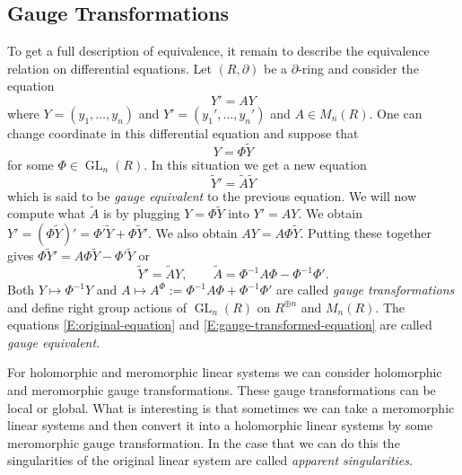 \documentclass[12pt]{book}
\numberwithin{equation}{section}
\theoremstyle{definition}
\theoremstyle{remark}
\newcommand{\GL}{\operatorname{GL}}
\begin{document}
\subsection{Gauge Transformations}
To get a full description of equivalence, it remain to describe the equivalence relation on differential equations.
Let $(R,\partial)$ be a $\partial$-ring and consider the equation
\begin{equation}\label{E:original-equation}
Y' = AY
\end{equation}
where $Y = (y_1,\ldots,y_n)$ and $Y' =(y_1',\ldots,y_n')$ and $A \in M_n(R)$. 
One can change coordinate in this differential equation and suppose that 
\begin{equation}\label{E:gauge-trans-one}
Y = \Phi \widetilde{Y}
\end{equation}
for some $\Phi \in \GL_n(R)$. 
In this situation we get a new equation 
\begin{equation}\label{E:gauge-transformed-equation}
\widetilde{Y}' = \widetilde{A} \widetilde{Y} 
\end{equation}
which is said to be \emph{gauge equivalent} to the previous equation. 
We will now compute what $\widetilde{A}$ is by plugging $Y = \Phi \widetilde{Y}$ into $Y'=AY$. 
We obtain $Y' = (\Phi \widetilde{Y})' = \Phi' \widetilde{Y} + \Phi \widetilde{Y}'$. 
We also obtain $AY = A\Phi \widetilde{Y}$. 
Putting these together gives $\Phi \widetilde{Y}' = A\Phi \widetilde{Y} - \Phi' \widetilde{Y}$ or 
$$ \widetilde{Y}' = \widetilde{A} Y, \qquad \widetilde{A} = \Phi^{-1} A \Phi - \Phi^{-1} \Phi '.$$
Both $Y \mapsto \Phi^{-1} Y$ and $A \mapsto A^{\Phi} := \Phi^{-1} A \Phi + \Phi^{-1} \Phi'$ are called \emph{gauge transformations} and define right group actions of $\GL_n(R)$ on $R^{\oplus n}$ and $M_n(R)$.
The equations \eqref{E:original-equation} and \eqref{E:gauge-transformed-equation} are called \emph{gauge equivalent}.

For holomorphic and meromorphic linear systems we can consider holomorphic and meromorphic gauge transformations. 
These gauge transformations can be local or global. 
What is interesting is that sometimes we can take a meromorphic linear systems and then convert it into a holomorphic linear systems by some meromorphic gauge transformation. 
In the case that we can do this the singularities of the original linear system are called \emph{apparent singularities}. 
\end{document}

